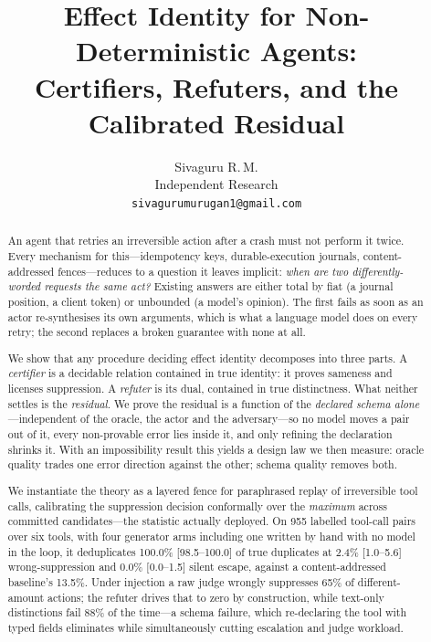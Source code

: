 \documentclass[10pt,twocolumn]{article}
\title{\vspace{-2em}\textbf{Effect Identity for Non-Deterministic Agents:\\
Certifiers, Refuters, and the Calibrated Residual}}
\author{Sivaguru R.\,M.\\
\small Independent Research \\
\small \texttt{sivagurumurugan1@gmail.com}}
\date{}
\theoremstyle{definition}
\theoremstyle{remark}
\begin{document}
\maketitle

\begin{abstract}
An agent that retries an irreversible action after a crash must not perform it
twice. Every mechanism for this---idempotency keys, durable-execution journals,
content-addressed fences---reduces to a question it leaves implicit: \emph{when
are two differently-worded requests the same act?} Existing answers are either
total by fiat (a journal position, a client token) or unbounded (a model's
opinion). The first fails as soon as an actor re-synthesises its own arguments,
which is what a language model does on every retry; the second replaces a broken
guarantee with none at all.

We show that any procedure deciding effect identity decomposes into three parts.
A \emph{certifier} is a decidable relation contained in true identity: it proves
sameness and licenses suppression. A \emph{refuter} is its dual, contained in
true distinctness. What neither settles is the \emph{residual}. We prove the
residual is a function of the \emph{declared schema alone}---independent of the
oracle, the actor and the adversary---so no model moves a pair out of it, every
non-provable error lies inside it, and only refining the declaration shrinks it.
With an impossibility result this yields a design law we then measure: oracle
quality trades one error direction against the other; schema quality removes
both.

We instantiate the theory as a layered fence for paraphrased replay of
irreversible tool calls, calibrating the suppression decision conformally over
the \emph{maximum} across committed candidates---the statistic actually
deployed. On 955 labelled tool-call pairs over six tools, with four generator
arms including one written by hand with no model in the loop, it deduplicates
100.0\% [98.5--100.0] of true duplicates at 2.4\% [1.0--5.6] wrong-suppression and
0.0\% [0.0--1.5] silent escape, against a content-addressed baseline's 13.5\%.
Under injection a raw judge wrongly suppresses 65\% of different-amount actions;
the refuter drives that to zero by construction, while text-only distinctions
fail 88\% of the time---a schema failure, which re-declaring the tool with typed
fields eliminates while simultaneously cutting escalation and judge workload.
\end{abstract}
\end{document}
